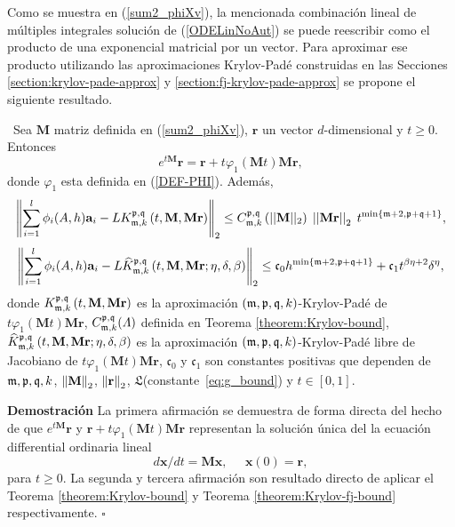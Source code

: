 Como se muestra en (\ref{sum2_phiXv}), la mencionada combinación lineal de múltiples integrales solución de (\ref{ODELinNoAut}) se puede reescribir como el producto de una exponencial matricial por un vector. Para aproximar ese producto utilizando las aproximaciones Krylov-Padé construidas en las Secciones \ref{section:krylov-pade-approx} y \ref{section:fj-krylov-pade-approx} se propone el siguiente resultado.

\begin{theorem} \label{theorem:Krylov-and-Krylov-fj-bounds}
	\cite{naranjo2023computing,naranjo2023RT}~Sea $\mathbf{M}$ matriz definida en (\ref{sum2_phiXv}), $\mathbf{r}$ un vector $d$-dimensional y $t\geq 0$. Entonces
	\[
	e^{t\mathbf{M}}\mathbf{r} = \mathbf{r} + t\varphi_1 (\mathbf{M}t)\mathbf{Mr},
	\]
	donde $\varphi_1$ esta definida en (\ref{DEF-PHI}). Además,
	\begin{equation}
      \left\Vert\sum\limits_{i=1}^{l}\phi _{i}(A,h)\mathbf{a}_{i}-	L K_{\mathfrak{m},k}^{\mathfrak{p},\mathfrak{q}}\left(t, \mathbf{M}, \mathbf{Mr} \right)
      \right\Vert_2 \leq C_{\mathfrak{m},k}^{\mathfrak{p},\mathfrak{q}}\left(\lvert\lvert \mathbf{M} \rvert\rvert_2\right) \;
	  \left\lvert \left\lvert \mathbf{Mr} \right\rvert \right\rvert_2 \; t^{\mathrm{min}\left\{ \mathfrak{m}+2,\mathfrak{p}+\mathfrak{q}+1 \right\}}, \label{phi_approx}
	\end{equation}
	\begin{equation}
		\left\Vert \sum\limits_{i=1}^{l}\phi _{i}(A,h)\mathbf{a}_{i} - L \widehat{K}_{\mathfrak{m},k}^{\mathfrak{p},\mathfrak{q}}\left(t, \mathbf{M} , \mathbf{Mr} ; \eta, \delta, \beta \right)
		\right\Vert_2 \leq \mathfrak{c}_0 h^{\min\{\mathfrak{m}+2,\mathfrak{p}+\mathfrak{q}+1\}} + \mathfrak{c}_1 t^{\beta\eta+2}\delta^{\eta}, \label{phi_approx_fj}
	\end{equation}
	donde $K_{\mathfrak{m},k}^{\mathfrak{p},\mathfrak{q}}\left(t, \mathbf{M}, \mathbf{Mr} \right)$ es la aproximación $(\mathfrak{m} , \mathfrak{p} ,\mathfrak{q} , k)$-Krylov-Padé de $t\varphi_1 (\mathbf{M}t)\mathbf{Mr}$,  $C_{\mathfrak{m},k}^{\mathfrak{p},\mathfrak{q}}(\varLambda)$ definida en Teorema \ref{theorem:Krylov-bound}, $\widehat{K}_{\mathfrak{m},k}^{\mathfrak{p},\mathfrak{q}}\left(t, \mathbf{M} , \mathbf{Mr} ; \eta, \delta, \beta \right)$  es la aproximación $(\mathfrak{m} , \mathfrak{p} ,\mathfrak{q} , k)$-Krylov-Padé libre de Jacobiano de $t\varphi_1 (\mathbf{M}t)\mathbf{Mr}$, $\mathfrak{c}_0$ y $\mathfrak{c}_1$ son constantes positivas que dependen de $\mathfrak{m},\mathfrak{p},\mathfrak{q},k$, $\left\lVert \mathbf{M} \right\rVert_2$, $\left\lVert \mathbf{r} \right\rVert_2$, $\mathfrak{L}$(constante~\ref{eq:g_bound}) y $t \in [0,1]$.
\end{theorem}
\textbf{Demostración} La primera afirmación se demuestra de forma directa del hecho de que $e^{t\mathbf{M}}\mathbf{r}$ y $\mathbf{r} + t\varphi_1 (\mathbf{M}t)\mathbf{Mr}$ representan la solución única del la ecuación differential ordinaria lineal
\[ d\mathbf{x}/dt= \mathbf{M}\mathbf{x},  \;\;\;\;\; \mathbf{x}(0)=\mathbf{r}, \]
para $t\geq 0$. La segunda y tercera afirmación son resultado directo de aplicar el Teorema \ref{theorem:Krylov-bound} y Teorema \ref{theorem:Krylov-fj-bound} respectivamente.
$\square$

